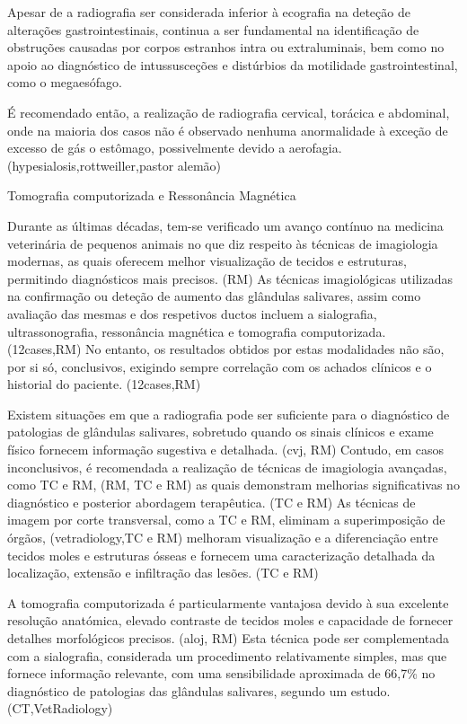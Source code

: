 Apesar de a radiografia ser considerada inferior à ecografia na deteção de alterações gastrointestinais, continua a ser fundamental na identificação de obstruções causadas por corpos estranhos intra ou extraluminais,\cite{Sharma2011} bem como no apoio ao diagnóstico de intussusceções e distúrbios da motilidade gastrointestinal, como o megaesófago. \cite{Jaikumar2013}


É recomendado então, a realização de radiografia cervical, torácica e abdominal, onde na maioria dos casos não é observado nenhuma anormalidade à exceção de excesso de gás o estômago, possivelmente devido a aerofagia. (hypesialosis,rottweiller,pastor alemão)


Tomografia computorizada e Ressonância Magnética


Durante as últimas décadas, tem-se verificado um avanço contínuo na medicina veterinária de pequenos animais no que diz respeito às técnicas de imagiologia modernas, as quais oferecem melhor visualização de tecidos e estruturas, permitindo diagnósticos mais precisos. (RM) As técnicas imagiológicas utilizadas na confirmação ou deteção de aumento das glândulas salivares, assim como avaliação das mesmas e dos respetivos ductos incluem a sialografia, ultrassonografia, ressonância magnética e tomografia computorizada. (12cases,RM) No entanto, os resultados obtidos por estas modalidades não são, por si só, conclusivos, exigindo sempre correlação com os achados clínicos e o historial do paciente. (12cases,RM)


Existem situações em que a radiografia pode ser suficiente para o diagnóstico de patologias de glândulas salivares, sobretudo quando os sinais clínicos e exame físico fornecem informação sugestiva e detalhada. (cvj, RM) Contudo, em casos inconclusivos, é recomendada a realização de técnicas de imagiologia avançadas, como TC e RM, (RM, TC e RM) as quais demonstram melhorias significativas no diagnóstico e posterior abordagem terapêutica. (TC e RM) As técnicas de imagem por corte transversal, como a TC e RM, eliminam a superimposição de órgãos, (vetradiology,TC e RM) melhoram visualização e a diferenciação entre tecidos moles e estruturas ósseas e fornecem uma caracterização detalhada da localização, extensão e infiltração das lesões. (TC e RM)


A tomografia computorizada é particularmente vantajosa devido à sua excelente resolução anatómica, elevado contraste de tecidos moles e capacidade de fornecer detalhes morfológicos precisos. (aloj, RM) Esta técnica pode ser complementada com a sialografia, considerada um procedimento relativamente simples, mas que fornece informação relevante, com uma sensibilidade aproximada de 66,7\% no diagnóstico de patologias das glândulas salivares, segundo um estudo. (CT,VetRadiology)


